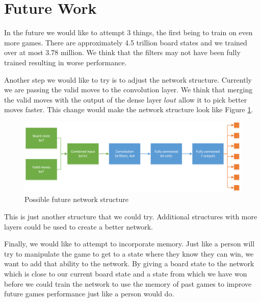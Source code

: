 \section{Future Work}
In the future we would like to attempt 3 things, the first being to train on even more games. There are approximately 4.5 trillion board states and we trained over at most 3.78 million. We think that the filters may not have been fully trained resulting in worse performance. 

Another step we would like to try is to adjust the network structure. Currently we are passing the valid moves to the convolution layer. We think that merging the valid moves with the output of the dense layer $lout$ allow it to pick better moves faster. This change would make the network structure look like Figure \ref{fig:struct_future}.

\begin{figure}
  \includegraphics[width=\linewidth]{Network1.png}
  \caption{Possible future network structure}
  \label{fig:struct_future}
\end{figure}

This is just another structure that we could try. Additional structures with more layers could be used to create a better network. 

Finally, we would like to attempt to incorporate memory. Just like a person will try to manipulate the game to get to a state where they know they can win, we want to add that ability to the network. By giving a board state to the network which is close to our current board state and a state from which we have won before we could train the network to use the memory of past games to improve future games performance just like a person would do.